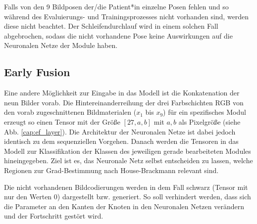 Falls von den 9 Bildposen der/die Patient*in einzelne Posen fehlen und so während des Evaluierungs- und Trainingsprozesses nicht vorhanden sind, werden diese nicht beachtet. Der Schleifendurchlauf wird in einem solchen Fall abgebrochen, sodass die nicht vorhandene Pose keine Auswirkungen auf die Neuronalen Netze der Module haben.



\subsection{Early Fusion}\label{earlyfusion_method}
Eine andere Möglichkeit zur Eingabe in das Modell ist die Konkatenation der neun Bilder vorab. Die Hintereinanderreihung der drei Farbschichten RGB von den vorab zugeschnittenen Bildmaterialen ($x_1$ bis $x_9$) für ein spezifisches Modul erzeugt so einen Tensor mit der Größe $[27, a, b]$ mit $a, b$ als Pixelgröße (siehe Abb. \ref{cap:ef_layer}). Die Architektur der Neuronalen Netze ist dabei jedoch identisch zu dem sequenziellen Vorgehen. Danach werden die Tensoren in das Modell zur Klassifikation der Klassen des jeweiligen gerade bearbeiteten Modules hineingegeben. Ziel ist es, das Neuronale Netz selbst entscheiden zu lassen, welche Regionen zur Grad-Bestimmung nach House-Brackmann relevant sind.

Die nicht vorhandenen Bildcodierungen werden in dem Fall schwarz (Tensor mit nur den Werten 0) dargestellt bzw. generiert. So soll verhindert werden, dass sich die Parameter an den Kanten der Knoten in den Neuronalen Netzen verändern und der Fortschritt gestört wird.


